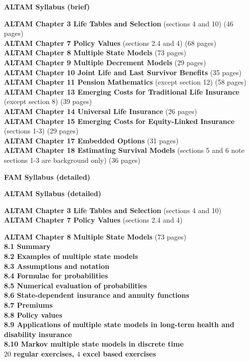 \documentclass[hidelinks, 12pt]{article}
\theoremstyle{mydefstyle}
\theoremstyle{mythmstyle}
\begin{document}
\textbf{ALTAM Syllabus (brief)}

\textbf{ALTAM Chapter 3 Life Tables and Selection} (sections 4 and 10) (46 pages) \\
\textbf{ALTAM Chapter 7 Policy Values} (sections 2.4 and 4) (68 pages) \\
\textbf{ALTAM Chapter 8 Multiple State Models} (73 pages) \\
\textbf{ALTAM Chapter 9 Multiple Decrement Models} (29 pages) \\
\textbf{ALTAM Chapter 10 Joint Life and Last Survivor Benefits} (35 pages) \\
\textbf{ALTAM Chapter 11 Pension Mathematics} (except section 12) (58 pages) \\
\textbf{ALTAM Chapter 13 Emerging Costs for Traditional Life Insurance} (except section 8) (39 pages) \\
\textbf{ALTAM Chapter 14 Universal Life Insurance} (26 pages) \\
\textbf{ALTAM Chapter 15 Emerging Costs for Equity-Linked Insurance} (sections 1-3) (29 pages) \\
\textbf{ALTAM Chapter 17 Embedded Options} (31 pages) \\
\textbf{ALTAM Chapter 18 Estimating Survival Models} (sections 5 and 6 note sections 1-3 are background only) (36 pages)

\textbf{FAM Syllabus (detailed)}

\textbf{ALTAM Syllabus (detailed)}

\textbf{ALTAM Chapter 3 Life Tables and Selection} (sections 4 and 10) \\
\textbf{ALTAM Chapter 7 Policy Values} (sections 2.4 and 4)

\textbf{ALTAM Chapter 8 Multiple State Models} (73 pages) \\
\textbf{8.1 Summary} \\
\textbf{8.2 Examples of multiple state models} \\
\textbf{8.3 Assumptions and notation} \\
\textbf{8.4 Formulae for probabilities} \\
\textbf{8.5 Numerical evaluation of probabilities} \\
\textbf{8.6 State-dependent insurance and annuity functions} \\
\textbf{8.7 Premiums} \\
\textbf{8.8 Policy values} \\
\textbf{8.9 Applications of multiple state models in long-term health and disability insurance} \\
\textbf{8.10 Markov multiple state models in discrete time} \\
\textbf{$20$ regular exercises, $4$ excel based exercises}
\end{document}
